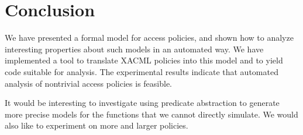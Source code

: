 \section{Conclusion}

We have presented a formal model for access policies, and shown how to
analyze interesting properties about such models in an automated way.
We have implemented a tool to translate XACML policies into this model
and to yield code suitable for analysis.  The experimental results
indicate that automated analysis of nontrivial access policies is
feasible.

It would be interesting to investigate using predicate abstraction to
generate more precise models for the functions that we cannot directly
simulate.  We would also like to experiment on more and larger
policies.



